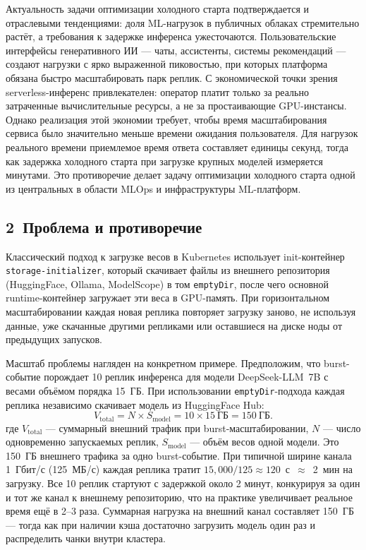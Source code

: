 Актуальность задачи оптимизации холодного старта подтверждается и отраслевыми тенденциями: доля ML-нагрузок в публичных облаках стремительно растёт, а требования к задержке инференса ужесточаются. Пользовательские интерфейсы генеративного ИИ --- чаты, ассистенты, системы рекомендаций --- создают нагрузки с ярко выраженной пиковостью, при которых платформа обязана быстро масштабировать парк реплик. С экономической точки зрения serverless-инференс привлекателен: оператор платит только за реально затраченные вычислительные ресурсы, а не за простаивающие GPU-инстансы. Однако реализация этой экономии требует, чтобы время масштабирования сервиса было значительно меньше времени ожидания пользователя. Для нагрузок реального времени приемлемое время ответа составляет единицы секунд, тогда как задержка холодного старта при загрузке крупных моделей измеряется минутами. Это противоречие делает задачу оптимизации холодного старта одной из центральных в области MLOps и инфраструктуры ML-платформ.

\subsection*{2~Проблема и противоречие}

Классический подход к загрузке весов в Kubernetes использует init-контейнер \texttt{storage-initializer}, который скачивает файлы из внешнего репозитория (HuggingFace, Ollama, ModelScope) в том \texttt{emptyDir}, после чего основной runtime-контейнер загружает эти веса в GPU-память. При горизонтальном масштабировании каждая новая реплика повторяет загрузку заново, не используя данные, уже скачанные другими репликами или оставшиеся на диске ноды от предыдущих запусков.

Масштаб проблемы нагляден на конкретном примере. Предположим, что burst-событие порождает 10 реплик инференса для модели DeepSeek-LLM~7B с весами объёмом порядка 15~ГБ. При использовании \texttt{emptyDir}-подхода каждая реплика независимо скачивает модель из HuggingFace Hub:
\begin{equation}
  V_{\mathrm{total}} = N \times S_{\mathrm{model}} = 10 \times 15~\text{ГБ} = 150~\text{ГБ}.
  \label{eq:intro-total-traffic}
\end{equation}
где $V_{\mathrm{total}}$ --- суммарный внешний трафик при burst-масштабировании, $N$ --- число одновременно запускаемых реплик, $S_{\mathrm{model}}$ --- объём весов одной модели.
Это 150~ГБ внешнего трафика за одно burst-событие. При типичной ширине канала 1~Гбит/с (125~МБ/с) каждая реплика тратит $15{,}000 / 125 \approx 120$~с~$\approx$~2~мин на загрузку. Все 10 реплик стартуют с задержкой около 2 минут, конкурируя за один и тот же канал к внешнему репозиторию, что на практике увеличивает реальное время ещё в 2--3 раза. Суммарная нагрузка на внешний канал составляет 150~ГБ --- тогда как при наличии кэша достаточно загрузить модель один раз и распределить чанки внутри кластера.

